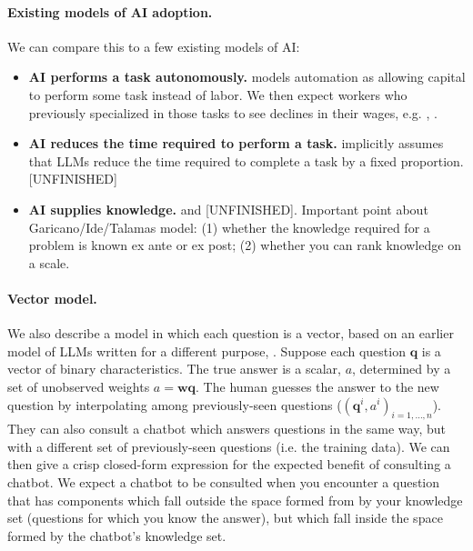 \documentclass[\ifdraft draft\fi]{article}
\begin{document}
   \paragraph{Existing models of AI adoption.} We can compare this to a few existing models of AI:
   \begin{itemize} 
      \item \textbf{AI performs a task autonomously.} \cite{zeira1998workers} models automation as allowing capital to perform some task instead of labor. We then expect workers who previously specialized in those tasks to see declines in their wages, e.g. \cite{acemoglu2011handbook}, \cite{acemoglu2018race}.
      \item \textbf{AI reduces the time required to perform a task.} \cite{eloundou2023gpts} implicitly assumes that LLMs reduce the time required to complete a task by a fixed proportion.[UNFINISHED]
      \item \textbf{AI supplies knowledge.} \citet{ide2024artificialintelligenceknowledgeeconomy} and \citet{autor2025expertise} [UNFINISHED]. Important point about Garicano/Ide/Talamas model: (1) whether the knowledge required for a problem is known ex ante or ex post; (2) whether you can rank knowledge on a scale.
   \end{itemize} 



   \paragraph{Vector model.} We also describe a model in which each question is a vector, based on an earlier model of LLMs written for a different purpose, \citet{cunningham2023imitation}. Suppose each question $\bm{q}$ is a vector of binary characteristics. The true answer is a scalar, $a$, determined by a set of unobserved weights $a=\bm{w}\bm{q}$. The human guesses the answer to the new question by interpolating among previously-seen questions ($(\bm{q}^i,a^i)_{i=1,\ldots,n}$). They can also consult a chatbot which answers questions in the same way, but with a different set of previously-seen questions (i.e. the training data). We can then give a crisp closed-form expression for the expected benefit of consulting a chatbot. We expect a chatbot to be consulted when you encounter a question that has components which fall outside the space formed from by your knowledge set (questions for which you know the answer), but which fall inside the space formed by the chatbot's knowledge set.
\end{document}
